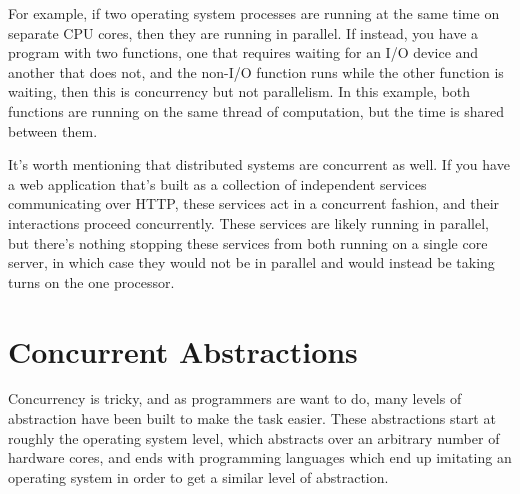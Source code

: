 \documentclass{article}
\begin{document}
For example, if two operating system processes are running at the same time on
separate CPU cores, then they are running in parallel. If instead, you have a
program with two functions, one that requires waiting for an I/O device and another
that does not, and the non-I/O function runs while the other function is waiting,
then this is concurrency but not parallelism. In this example, both functions are
running on the same thread of computation, but the time is shared between them.

It's worth mentioning that distributed systems are concurrent as well. If you have
a web application that's built as a collection of independent services communicating
over HTTP, these services act in a concurrent fashion, and their interactions proceed
concurrently. These services are likely running in parallel, but there's nothing stopping
these services from both running on a single core server, in which case they would not
be in parallel and would instead be taking turns on the one processor.


\section{Concurrent Abstractions}
Concurrency is tricky, and as programmers are want to do, many levels of abstraction
have been built to make the task easier. These abstractions start at roughly the operating
system level, which abstracts over an arbitrary number of hardware cores, and ends with
programming languages which end up imitating an operating system in order to get a similar
level of abstraction.

\end{document}
